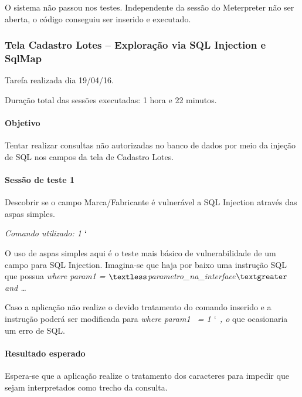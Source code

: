 \documentclass[
    12pt,               %
    openright,          %
    oneside,            %
    a4paper,            %
    section=TITLE,     %
    english,            %
    french,             %
    spanish,            %
    brazil              %
    ]{abntex2}
\begin{document}
O sistema não passou nos testes. Independente da sessão do Meterpreter não ser aberta, o código conseguiu ser inserido e executado.





\subsubsection*{Tela Cadastro Lotes -- Exploração via SQL Injection e SqlMap}

Tarefa realizada dia 19/04/16.


Duração total das sessões executadas: 1 hora e 22 minutos.



\paragraph*{Objetivo}

Tentar realizar consultas não autorizadas no banco de dados por meio da injeção de SQL nos campos da tela de Cadastro Lotes.



\paragraph*{Sessão de teste 1}

Descobrir se o campo Marca/Fabricante é vulnerável a SQL Injection através das aspas simples.


\emph{Comando utilizado: 1 $\lq$}


O uso de aspas simples aqui é o teste mais básico de vulnerabilidade de um campo para SQL Injection. Imagina-se que haja por baixo uma instrução SQL que possua\emph{ where param1 = $\textless$parametro\_na\_interface$\textgreater$ and \ldots{} }


Caso a aplicação não realize o devido tratamento do comando inserido e a instrução poderá ser modificada para \emph{where param1 ~= 1 $\lq$ , o} que ocasionaria um erro de SQL.



\paragraph*{Resultado esperado}

Espera-se que a aplicação realize o tratamento dos caracteres para impedir que sejam interpretados como trecho da consulta.
\end{document}
